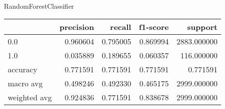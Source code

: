 RandomForestClassifier
\begin{tabular}{lrrrr}
\toprule
{} &  precision &    recall &  f1-score &      support \\
\midrule
0.0          &   0.960604 &  0.795005 &  0.869994 &  2883.000000 \\
1.0          &   0.035889 &  0.189655 &  0.060357 &   116.000000 \\
accuracy     &   0.771591 &  0.771591 &  0.771591 &     0.771591 \\
macro avg    &   0.498246 &  0.492330 &  0.465175 &  2999.000000 \\
weighted avg &   0.924836 &  0.771591 &  0.838678 &  2999.000000 \\
\bottomrule
\end{tabular}
